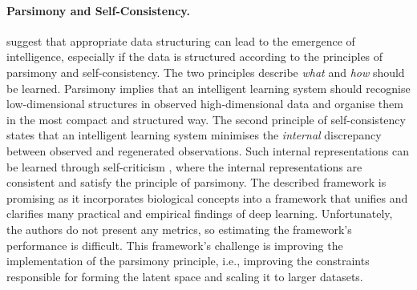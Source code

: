 \paragraph{Parsimony and Self-Consistency.}  suggest that appropriate data structuring can lead to the emergence of intelligence, especially if the data is structured according to the principles of parsimony and self-consistency. The two principles describe \emph{what} and \emph{how} should be learned. Parsimony implies that an intelligent learning system should recognise low-dimensional structures in observed high-dimensional data and organise them in the most compact and structured way. The second principle of self-consistency states that an intelligent learning system minimises the \emph{internal} discrepancy between observed and regenerated observations. Such internal representations can be learned through self-criticism , where the internal representations are consistent and satisfy the principle of parsimony. The described framework is promising as it incorporates biological concepts into a framework that unifies and clarifies many practical and empirical findings of deep learning.
Unfortunately, the authors do not present any metrics, so estimating the framework's performance is difficult.
This framework's challenge is improving the implementation of the parsimony principle, i.e., improving the constraints responsible for forming the latent space and scaling it to larger datasets.

